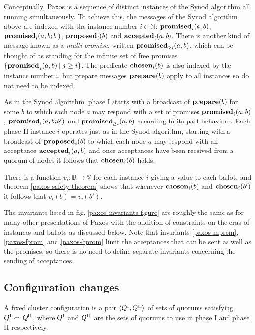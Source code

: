 \documentclass[journal]{IEEEtran}
\begin{document}
Conceptually, Paxos is a sequence of distinct instances of the Synod algorithm
all running simultaneously. To achieve this, the messages of the Synod
algorithm above are indexed with the instance number $i \in \mathbb N$:
$\mathbf{promised}_{i}(a,b)$, $\mathbf{promised}_{i}(a,b;b')$, $\mathbf{proposed}_{i}(b)$ and $\mathbf{accepted}_{i}(a,b)$.
There is another kind of message known as a \textit{multi-promise}, written
$\mathbf{promised}_{\ge i}(a,b)$, which can be thought of as standing for the infinite set of
free promises ${\{ \mathbf{promised}_{j}(a,b) \mid j \ge i \}}$. The predicate
$\mathbf{chosen}_{i}(b)$ is also indexed by the instance number $i$, but prepare
messages $\mathbf{prepare}(b)$ apply to all instances so do not need to be indexed.

As in the Synod algorithm, phase I starts with a broadcast of $\mathbf{prepare}(b)$ for
some $b$ to which each node $a$ may respond with a set of promises
$\mathbf{promised}_{i}(a,b)$, $\mathbf{promised}_{i}(a,b;b')$ and $\mathbf{promised}_{\ge i}(a,b)$ according to its
past behaviour. Each phase II instance $i$ operates just as in the Synod
algorithm, starting with a broadcast of $\mathbf{proposed}_{i}(b)$ to which each node $a$
may respond with an acceptance $\mathbf{accepted}_{i}(a,b)$ and once acceptances have been
received from a quorum of nodes it follows that $\mathbf{chosen}_{i}(b)$ holds.

There is a function $v_i : \mathbb B \to \mathbb V$ for each instance $i$
giving a value to each ballot, and theorem \ref{paxos-safety-theorem} shows
that whenever $\mathbf{chosen}_{i}(b)$ and $\mathbf{chosen}_{i}(b')$ it follows that $v_i(b) =
v_i(b')$.

The invariants listed in fig. \ref{paxos-invariants-figure} are roughly the
same as for many other presentations of Paxos with the addition of constraints
on the eras of instances and ballots as discussed below. Note that invariants
\ref{paxos-mprom}, \ref{paxos-fprom} and \ref{paxos-bprom} limit the
acceptances that can be sent as well as the promises, so there is no need to
define separate invariants concerning the sending of acceptances.

\subsection{Configuration changes}\label{configuration-changes}

A fixed cluster configuration is a pair $\langle {Q}^\textrm{I}_{}, {Q}^\textrm{II}_{} \rangle$ of sets
of quorums satisfying ${Q}^\textrm{I}_{} \frown {Q}^\textrm{II}_{}$, where ${Q}^\textrm{I}_{}$ and ${Q}^\textrm{II}_{}$ are the
sets of quorums to use in phase I and phase II respectively.
\end{document}
